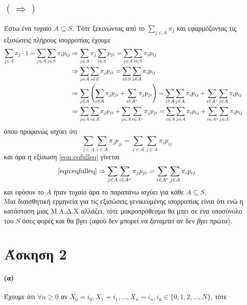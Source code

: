 \documentclass[a4paper,11pt]{article}
\begin{document}
\subsection*{$(\Rightarrow)$}
Έστω ένα τυχαίο $A \subseteq S$. Τότε ξεκινώντας από το $\sum_{j\in A} \pi_j$ και εφαρμόζοντας τις εξισώσεις πλήρους ισορροπίας έχουμε
\begin{align}
	\sum_{j\in A} \pi_j \cdot 1  = \sum_{j\in A} \sum_{i\in S} \pi_i p_{ij}
		&\Rightarrow \sum_{j\in A} \pi_j \sum_{i\in S} p_{ji}  = \sum_{j\in A} \sum_{i\in S} \pi_i p_{ij} \notag &\\
		&\Rightarrow \sum_{j\in A} \sum_{i\in S} \pi_j p_{ji}  = \sum_{i\in S} \sum_{j\in A} \pi_i p_{ij} \notag \\
		&\Rightarrow \sum_{j\in A} \left( \sum_{i\in A} \pi_j p_{ji} + \sum_{i\in A^c} \pi_j p_{ji} \right) = \sum_{i\in A} \sum_{j\in A} \pi_i p_{ij} + \sum_{i\in A^c} \sum_{j\in A} \pi_i p_{ij} \notag \\
		&\Rightarrow \sum_{j\in A} \sum_{i\in A} \pi_j p_{ji} + \sum_{j\in A} \sum_{i\in A^c} \pi_j p_{ji} = \sum_{i\in A} \sum_{j\in A} \pi_i p_{ij} + \sum_{i\in A^c} \sum_{j\in A} \pi_i p_{ij} \label{eqn:eqfulleq}
\end{align}
όπου προφανώς ισχύει ότι
\[
	\sum_{j\in A} \sum_{i\in A} \pi_j p_{ji} = \sum_{i\in A} \sum_{j\in A} \pi_i p_{ij}
\]
και άρα η εξίσωση \eqref{eqn:eqfulleq} γίνεται
\[
	\eqref{eqn:eqfulleq} \Rightarrow \sum_{j\in A} \sum_{i\in A^c} \pi_j p_{ji} = \sum_{i\in A^c} \sum_{j\in A} \pi_i p_{ij}
\]
και εφόσον το $A$ ήταν τυχαίο άρα το παραπάνω ισχύει για κάθε $A \subseteq S$.
\\[8pt]
Μια διαισθητική ερμηνεία για τις εξισώσεις γενικευμένης ισορροπίας είναι ότι ενώ η κατάσταση μιας Μ.Α.Δ.Χ αλλάζει, τότε μακροπρόθεσμα θα μπει σε ένα υποσύνολο του $S$ όσες φορές και θα βγει (αφού δεν μπορεί να \textit{ξαναμπεί} αν δεν \textit{βγει} πρώτα).


\section*{Άσκηση 2}

\paragraph{(α)}
Έχουμε ότι $\forall n \geq 0$ αν $X_0=i_0, X_1=i_1, \dots, X_n=i_n, i_k \in \{0,1,2,\dots,N\}$, τότε
\end{document}
